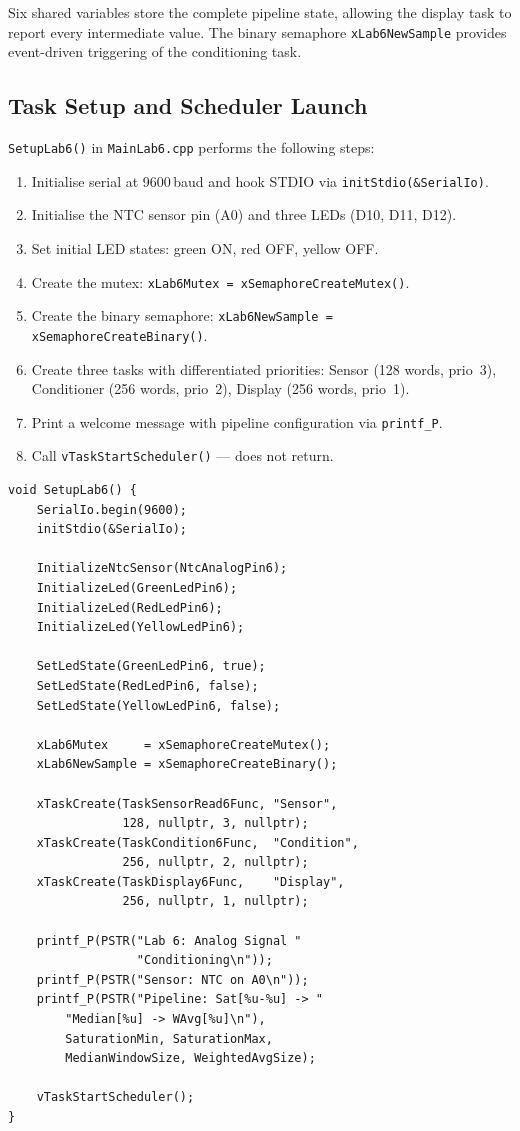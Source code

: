 \documentclass[12pt]{article}
\begin{document}
Six shared variables store the complete pipeline state, allowing the display task to report every intermediate value. The binary semaphore \texttt{xLab6NewSample} provides event-driven triggering of the conditioning task.

\subsection{Task Setup and Scheduler Launch}

\texttt{SetupLab6()} in \texttt{MainLab6.cpp} performs the following steps:
\begin{enumerate}
  \item Initialise serial at 9600\,baud and hook STDIO via \texttt{initStdio(\&SerialIo)}.
  \item Initialise the NTC sensor pin (A0) and three LEDs (D10, D11, D12).
  \item Set initial LED states: green ON, red OFF, yellow OFF.
  \item Create the mutex: \texttt{xLab6Mutex = xSemaphoreCreateMutex()}.
  \item Create the binary semaphore: \texttt{xLab6NewSample = xSemaphoreCreateBinary()}.
  \item Create three tasks with differentiated priorities: Sensor (128 words, prio~3), Conditioner (256 words, prio~2), Display (256 words, prio~1).
  \item Print a welcome message with pipeline configuration via \texttt{printf\_P}.
  \item Call \texttt{vTaskStartScheduler()} --- does not return.
\end{enumerate}

\begin{lstlisting}[caption={SetupLab6 --- task creation and scheduler launch}]
void SetupLab6() {
    SerialIo.begin(9600);
    initStdio(&SerialIo);

    InitializeNtcSensor(NtcAnalogPin6);
    InitializeLed(GreenLedPin6);
    InitializeLed(RedLedPin6);
    InitializeLed(YellowLedPin6);

    SetLedState(GreenLedPin6, true);
    SetLedState(RedLedPin6, false);
    SetLedState(YellowLedPin6, false);

    xLab6Mutex     = xSemaphoreCreateMutex();
    xLab6NewSample = xSemaphoreCreateBinary();

    xTaskCreate(TaskSensorRead6Func, "Sensor",
                128, nullptr, 3, nullptr);
    xTaskCreate(TaskCondition6Func,  "Condition",
                256, nullptr, 2, nullptr);
    xTaskCreate(TaskDisplay6Func,    "Display",
                256, nullptr, 1, nullptr);

    printf_P(PSTR("Lab 6: Analog Signal "
                  "Conditioning\n"));
    printf_P(PSTR("Sensor: NTC on A0\n"));
    printf_P(PSTR("Pipeline: Sat[%u-%u] -> "
        "Median[%u] -> WAvg[%u]\n"),
        SaturationMin, SaturationMax,
        MedianWindowSize, WeightedAvgSize);

    vTaskStartScheduler();
}
\end{lstlisting}
\end{document}
